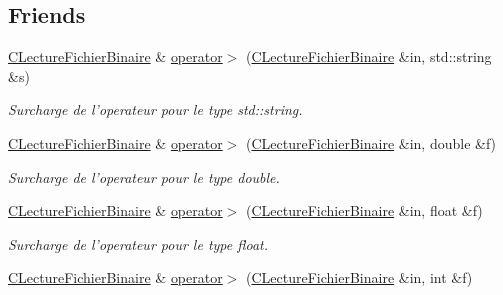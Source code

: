 \subsection*{Friends}
\begin{DoxyCompactItemize}
\item 
\hypertarget{class_c_lecture_fichier_binaire_abc9f4d65dcf682dbf572f5110a00252d}{\hyperlink{class_c_lecture_fichier_binaire}{C\-Lecture\-Fichier\-Binaire} \& \hyperlink{class_c_lecture_fichier_binaire_abc9f4d65dcf682dbf572f5110a00252d}{operator$>$} (\hyperlink{class_c_lecture_fichier_binaire}{C\-Lecture\-Fichier\-Binaire} \&in, std\-::string \&s)}\label{class_c_lecture_fichier_binaire_abc9f4d65dcf682dbf572f5110a00252d}

\begin{DoxyCompactList}\small\item\em Surcharge de l'operateur pour le type {\itshape std\-::string}. \end{DoxyCompactList}\item 
\hypertarget{class_c_lecture_fichier_binaire_a8b4123b210cccf9da0d2eb60dc19b8a0}{\hyperlink{class_c_lecture_fichier_binaire}{C\-Lecture\-Fichier\-Binaire} \& \hyperlink{class_c_lecture_fichier_binaire_a8b4123b210cccf9da0d2eb60dc19b8a0}{operator$>$} (\hyperlink{class_c_lecture_fichier_binaire}{C\-Lecture\-Fichier\-Binaire} \&in, double \&f)}\label{class_c_lecture_fichier_binaire_a8b4123b210cccf9da0d2eb60dc19b8a0}

\begin{DoxyCompactList}\small\item\em Surcharge de l'operateur pour le type {\itshape double}. \end{DoxyCompactList}\item 
\hypertarget{class_c_lecture_fichier_binaire_a8727572665715de99f2908c711e45114}{\hyperlink{class_c_lecture_fichier_binaire}{C\-Lecture\-Fichier\-Binaire} \& \hyperlink{class_c_lecture_fichier_binaire_a8727572665715de99f2908c711e45114}{operator$>$} (\hyperlink{class_c_lecture_fichier_binaire}{C\-Lecture\-Fichier\-Binaire} \&in, float \&f)}\label{class_c_lecture_fichier_binaire_a8727572665715de99f2908c711e45114}

\begin{DoxyCompactList}\small\item\em Surcharge de l'operateur pour le type {\itshape float}. \end{DoxyCompactList}\item 
\hypertarget{class_c_lecture_fichier_binaire_a327898e8bcb11d00bdb07e3e8bd361bd}{\hyperlink{class_c_lecture_fichier_binaire}{C\-Lecture\-Fichier\-Binaire} \& \hyperlink{class_c_lecture_fichier_binaire_a327898e8bcb11d00bdb07e3e8bd361bd}{operator$>$} (\hyperlink{class_c_lecture_fichier_binaire}{C\-Lecture\-Fichier\-Binaire} \&in, int \&f)}\label{class_c_lecture_fichier_binaire_a327898e8bcb11d00bdb07e3e8bd361bd}


\end{DoxyCompactItemize}
